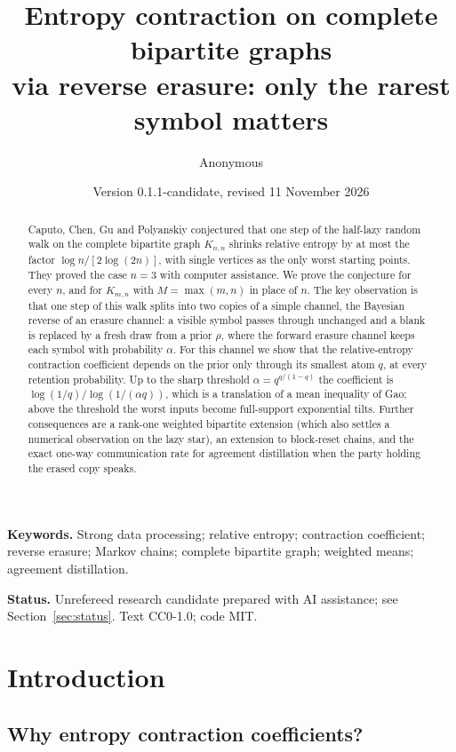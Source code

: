 \documentclass[11pt,a4paper]{article}
\title{\textbf{Entropy contraction on complete bipartite graphs\\
via reverse erasure: only the rarest symbol matters}}
\author{Anonymous}
\date{Version 0.1.1-candidate, revised 11 November 2026}
\numberwithin{equation}{section}
\theoremstyle{definition}
\theoremstyle{remark}
\begin{document}
\maketitle
\thispagestyle{plain}
\begin{abstract}
Caputo, Chen, Gu and Polyanskiy conjectured that one step of the half-lazy
random walk on the complete bipartite graph \(K_{n,n}\) shrinks relative
entropy by at most the factor \(\log n/[2\log(2n)]\), with single vertices
as the only worst starting points. They proved the case \(n=3\) with
computer assistance. We prove the conjecture for every \(n\), and for
\(K_{m,n}\) with \(M=\max(m,n)\) in place of \(n\). The key observation is
that one step of this walk splits into two copies of a simple channel, the
Bayesian reverse of an erasure channel: a visible symbol passes through
unchanged and a blank is replaced by a fresh draw from a prior \(\rho\),
where the forward erasure channel keeps each symbol with probability
\(\alpha\). For this channel we show that the relative-entropy contraction
coefficient depends on the prior only through its smallest atom \(q\), at
every retention probability. Up to the sharp threshold
\(\alpha=q^{q/(1-q)}\) the coefficient is \(\log(1/q)/\log(1/(\alpha q))\),
which is a translation of a mean inequality of Gao; above the threshold
the worst inputs become full-support exponential tilts. Further
consequences are a rank-one weighted bipartite extension (which also settles
a numerical observation on the lazy star), an extension to block-reset
chains, and the exact one-way communication rate for agreement distillation
when the party holding the erased copy speaks.
\end{abstract}

\noindent\textbf{Keywords.} Strong data processing; relative entropy;
contraction coefficient; reverse erasure; Markov chains; complete bipartite
graph; weighted means; agreement distillation.

\medskip
\noindent\textbf{Status.} Unrefereed research candidate prepared with AI
assistance; see Section~\ref{sec:status}. Text CC0-1.0; code MIT.

\section{Introduction}\label{sec:intro}

\subsection{Why entropy contraction coefficients?}
\end{document}
